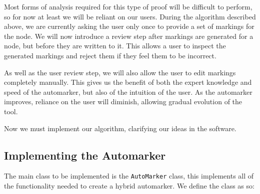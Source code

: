 \documentclass[twoside,a4paper]{report}
\begin{document}
Most forms of analysis required for this type of proof will be difficult to perform, so for now at least we will be reliant on our users. During the
algorithm described above, we are currently asking the user only once to provide a set of markings for the node. We will now introduce a review step
after markings are generated for a node, but before they are written to it. This allows a user to inspect the generated markings and reject them if
they feel them to be incorrect.

As well as the user review step, we will also allow the user to edit markings completely manually. This gives us the benefit of both the expert
knowledge and speed of the automarker, but also of the intuition of the user. As the automarker improves, reliance on the user will diminish, allowing
gradual evolution of the tool.

Now we must implement our algorithm, clarifying our ideas in the software.

\subsection{Implementing the Automarker}

The main class to be implemented is the \texttt{AutoMarker} class, this implements all of the functionality needed to create a hybrid automarker.
We define the class as so:
\end{document}
